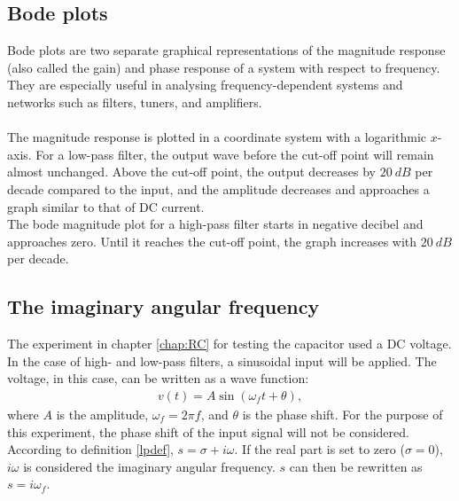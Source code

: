 \subsection{Bode plots} \label{sub:bode}
Bode plots are two separate graphical representations of the magnitude response (also called the gain) and phase response of a system with respect to frequency. They are especially useful in analysing frequency-dependent systems and networks such as filters, tuners, and amplifiers. \cite [p. 626]{bcircuit5}  \\
\\
The magnitude response is plotted in a coordinate system with a logarithmic $x$-axis. For a low-pass filter, the output wave before the cut-off point will remain almost unchanged. Above the cut-off point, the output decreases by $20\ dB$ per decade compared to the input, and the amplitude decreases and approaches a graph similar to that of DC current. \\
The bode magnitude plot for a high-pass filter starts in negative decibel and approaches zero. Until it reaches the cut-off point, the graph increases with $20\ dB$ per decade.

\subsection{The imaginary angular frequency}\label{sub:imfreq}
The experiment in chapter \ref{chap:RC} for testing the capacitor used a DC voltage. In the case of high- and low-pass filters, a sinusoidal input will be applied. The voltage, in this case, can be written as a wave function:
\begin{align*}
v(t)=A\sin(\omega_f t+\theta),
\end{align*}
where $A$ is the amplitude, $\omega_f=2\pi f$, and $\theta$ is the phase shift. For the purpose of this experiment, the phase shift of the input signal will not be considered. According to definition \ref{lpdef}, $s=\sigma + i \omega$. If the real part is set to zero ($\sigma = 0$), $i \omega$ is considered the imaginary angular frequency. $s$ can then be rewritten as $s = i \omega_f$. \cite[p. 733 - 735]{bcircuit9}


